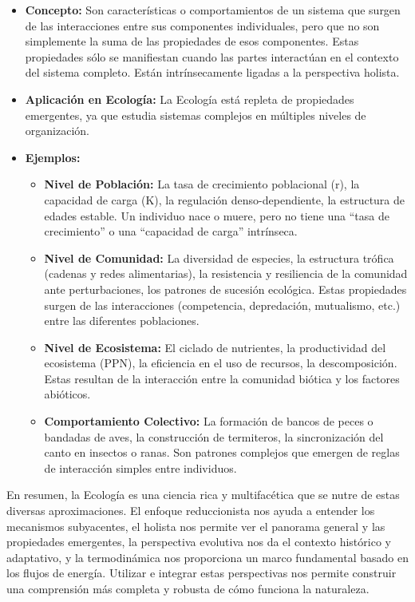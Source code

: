 \documentclass[
]{book}
\providecommand{\tightlist}{%
  \setlength{\itemsep}{0pt}\setlength{\parskip}{0pt}}
\begin{document}
\begin{itemize}
\tightlist
\item
  \textbf{Concepto:} Son características o comportamientos de un sistema que surgen de las interacciones entre sus componentes individuales, pero que no son simplemente la suma de las propiedades de esos componentes. Estas propiedades sólo se manifiestan cuando las partes interactúan en el contexto del sistema completo. Están intrínsecamente ligadas a la perspectiva holista.
\item
  \textbf{Aplicación en Ecología:} La Ecología está repleta de propiedades emergentes, ya que estudia sistemas complejos en múltiples niveles de organización.
\item
  \textbf{Ejemplos:}

  \begin{itemize}
  \tightlist
  \item
    \textbf{Nivel de Población:} La tasa de crecimiento poblacional (r), la capacidad de carga (K), la regulación denso-dependiente, la estructura de edades estable. Un individuo nace o muere, pero no tiene una ``tasa de crecimiento'' o una ``capacidad de carga'' intrínseca.
  \item
    \textbf{Nivel de Comunidad:} La diversidad de especies, la estructura trófica (cadenas y redes alimentarias), la resistencia y resiliencia de la comunidad ante perturbaciones, los patrones de sucesión ecológica. Estas propiedades surgen de las interacciones (competencia, depredación, mutualismo, etc.) entre las diferentes poblaciones.
  \item
    \textbf{Nivel de Ecosistema:} El ciclado de nutrientes, la productividad del ecosistema (PPN), la eficiencia en el uso de recursos, la descomposición. Estas resultan de la interacción entre la comunidad biótica y los factores abióticos.
  \item
    \textbf{Comportamiento Colectivo:} La formación de bancos de peces o bandadas de aves, la construcción de termiteros, la sincronización del canto en insectos o ranas. Son patrones complejos que emergen de reglas de interacción simples entre individuos.
  \end{itemize}
\end{itemize}

En resumen, la Ecología es una ciencia rica y multifacética que se nutre de estas diversas aproximaciones. El enfoque reduccionista nos ayuda a entender los mecanismos subyacentes, el holista nos permite ver el panorama general y las propiedades emergentes, la perspectiva evolutiva nos da el contexto histórico y adaptativo, y la termodinámica nos proporciona un marco fundamental basado en los flujos de energía. Utilizar e integrar estas perspectivas nos permite construir una comprensión más completa y robusta de cómo funciona la naturaleza.
\end{document}

